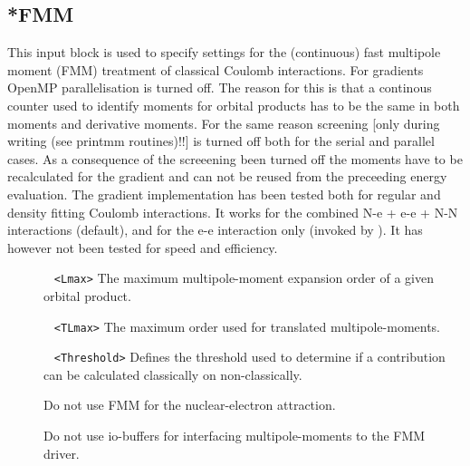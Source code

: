 \subsection{*FMM}\label{subsec:denfit}

This input block is used to specify settings for the (continuous) fast multipole moment (FMM) treatment of 
classical Coulomb interactions.\newline
%
%
For gradients OpenMP parallelisation is turned off. The reason for this is that a continous counter used 
to identify moments for orbital products has to be the same in both moments and derivative moments. 
For the same reason screening [only during writing (see printmm routines)!!] is turned off both for the serial 
and parallel cases. As a consequence of the screeening been turned off the moments have to be recalculated for the gradient and can not be reused from the preceeding energy evaluation. 
%
%
The gradient implementation has been tested both for regular and density fitting Coulomb interactions. 
It works for the combined N-e +  e-e + N-N interactions (default), 
and for the e-e interaction only (invoked by ).
It has however not been tested for speed and efficiency.
%
\begin{description}
\item[] \verb| |\newline
\verb|<Lmax>|\newline
The maximum multipole-moment expansion order of a given orbital product.
\item[] \verb| |\newline
\verb|<TLmax>|\newline
The maximum order used for translated multipole-moments.
\item[] \verb| |\newline
\verb|<Threshold>|\newline
Defines the threshold used to determine if a contribution can be calculated classically on non-classically.
\item[] Do not use FMM for the nuclear-electron attraction.
\item[] Do not use io-buffers for interfacing multipole-moments to the FMM driver.
\end{description}

